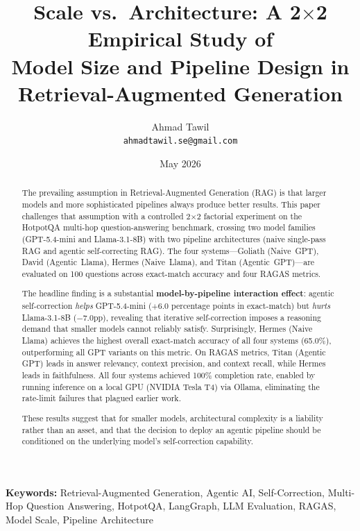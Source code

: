 \documentclass[12pt]{article}
\title{\textbf{\Large Scale vs.\ Architecture: A 2$\times$2 Empirical Study of\\
Model Size and Pipeline Design in Retrieval-Augmented Generation}}
\author{Ahmad Tawil \\ \texttt{ahmadtawil.se@gmail.com}}
\date{May 2026}
\begin{document}
\maketitle

\begin{abstract}
The prevailing assumption in Retrieval-Augmented Generation (RAG) is that
larger models and more sophisticated pipelines always produce better results.
This paper challenges that assumption with a controlled 2$\times$2 factorial
experiment on the HotpotQA multi-hop question-answering benchmark, crossing
two model families (GPT-5.4-mini and Llama-3.1-8B) with two pipeline
architectures (naive single-pass RAG and agentic self-correcting RAG).
The four systems---Goliath (Naive~GPT), David (Agentic~Llama), Hermes
(Naive~Llama), and Titan (Agentic~GPT)---are evaluated on 100 questions
across exact-match accuracy and four RAGAS metrics.

The headline finding is a substantial \textbf{model-by-pipeline interaction
effect}: agentic self-correction \emph{helps} GPT-5.4-mini ($+6.0$ percentage
points in exact-match) but \emph{hurts} Llama-3.1-8B ($-7.0$pp), revealing
that iterative self-correction imposes a reasoning demand that smaller models
cannot reliably satisfy.  Surprisingly, Hermes (Naive Llama) achieves the
highest overall exact-match accuracy of all four systems (65.0\%), outperforming
all GPT variants on this metric.  On RAGAS metrics, Titan (Agentic GPT) leads
in answer relevancy, context precision, and context recall, while Hermes leads
in faithfulness.  All four systems achieved 100\% completion rate, enabled by
running inference on a local GPU (NVIDIA Tesla T4) via Ollama, eliminating the
rate-limit failures that plagued earlier work.

These results suggest that for smaller models, architectural complexity is a
liability rather than an asset, and that the decision to deploy an agentic
pipeline should be conditioned on the underlying model's self-correction
capability.
\end{abstract}

\noindent\textbf{Keywords:} Retrieval-Augmented Generation, Agentic AI,
Self-Correction, Multi-Hop Question Answering, HotpotQA, LangGraph,
LLM Evaluation, RAGAS, Model Scale, Pipeline Architecture

\end{document}
